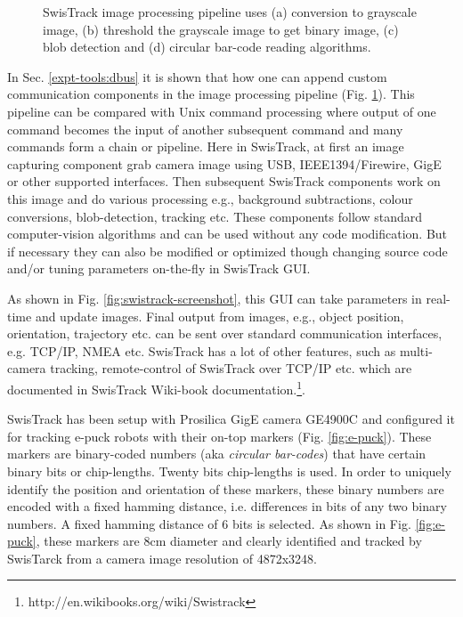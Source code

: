 \begin{figure}
\centering
{} 
\hspace{0.25cm}
\vspace{1cm}
\hspace{0.25cm}
\caption{SwisTrack image processing pipeline uses (a)  conversion to grayscale image, (b) threshold the grayscale image to get binary image, (c) blob detection and (d) circular bar-code reading algorithms.}
\label{fig:swistrack-pipeline}
\end{figure}
In Sec. \ref{expt-tools:dbus} it is shown that how one can append custom communication components in the image processing pipeline (Fig. \ref{fig:swistrack-pipeline}). This pipeline can be compared with Unix command processing where output of one command becomes the input of another subsequent command and many commands form a chain or pipeline. Here in SwisTrack, at first an image capturing component grab camera image using USB, IEEE1394/Firewire, GigE or other supported interfaces. Then subsequent SwisTrack components work on this image and do various processing e.g., background subtractions, colour conversions, blob-detection, tracking etc. These components follow standard computer-vision algorithms and can be used without any code modification. But if necessary they can also be modified or optimized though changing source code and/or tuning parameters on-the-fly in SwisTrack GUI.

As shown in Fig. \ref{fig:swistrack-screenshot}, this GUI can take parameters in real-time and update images. Final output from images, e.g., object position, orientation, trajectory etc. can be sent over standard communication interfaces, e.g. TCP/IP, NMEA etc. SwisTrack has a lot of other features, such as multi-camera tracking, remote-control of SwisTrack over TCP/IP etc. which are documented in SwisTrack Wiki-book documentation.\footnote{http://en.wikibooks.org/wiki/Swistrack}.

SwisTrack has been setup with  Prosilica GigE camera GE4900C and configured it for tracking e-puck robots with their on-top markers (Fig. \ref{fig:e-puck}). These markers are binary-coded numbers (aka {\em circular bar-codes}) that have certain binary bits or chip-lengths.  Twenty bits chip-lengths is used. In order to uniquely identify the position and orientation of these markers, these binary numbers are encoded with a fixed hamming distance, i.e. differences in bits of any two binary numbers. A fixed hamming distance of 6 bits is selected. As shown in Fig. \ref{fig:e-puck}, these markers are 8cm diameter and clearly identified and tracked by SwisTarck from a camera image resolution of 4872x3248. 

